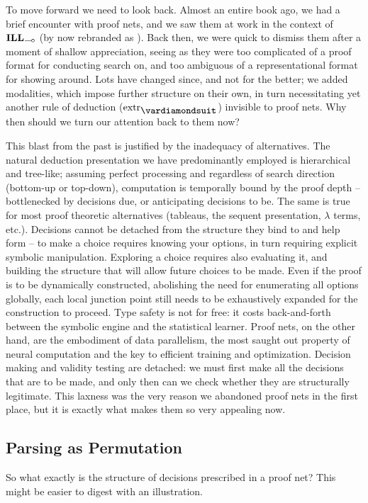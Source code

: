 To move forward we need to look back.
Almost an entire book ago, we had a brief encounter with proof nets, and we saw them at work in the context of $\ILL_{\li}$ (by now rebranded as \NLP).
Back then, we were quick to dismiss them after a moment of shallow appreciation, seeing as they were too complicated of a proof format for conducting search on, and too ambiguous of a representational format for showing around.
Lots have changed since, and not for the better; we added modalities, which impose further structure on their own, in turn necessitating yet another rule of deduction ($\Extraction$) invisible to proof nets.
Why then should we turn our attention back to them now?

This blast from the past is justified by the inadequacy of alternatives.
The natural deduction presentation we have predominantly employed is hierarchical and tree-like; assuming perfect processing and regardless of search direction (bottom-up or top-down), computation is temporally bound by the proof depth -- bottlenecked by decisions due, or anticipating decisions to be.
The same is true for most proof theoretic alternatives (tableaus, the sequent presentation, $\lambda$ terms, etc.).%
Decisions cannot be detached from the structure they bind to and help form -- to make a choice requires knowing your options, in turn requiring explicit symbolic manipulation.
Exploring a choice requires also evaluating it, and building the structure that will allow future choices to be made.
Even if the proof is to be dynamically constructed, abolishing the need for enumerating all options globally, each local junction point still needs to be exhaustively expanded for the construction to proceed.
Type safety is not for free: it costs back-and-forth between the symbolic engine and the statistical learner.
Proof nets, on the other hand, are the embodiment of data parallelism, the most saught out property of neural computation and the key to efficient training and optimization.
Decision making and validity testing are detached: we must first make all the decisions that are to be made, and only then can we check whether they are structurally legitimate.
This laxness was the very reason we abandoned proof nets in the first place, but it is exactly what makes them so very appealing now.

\subsection{Parsing as Permutation}
So what exactly is the structure of decisions prescribed in a proof net?
This might be easier to digest with an illustration.

